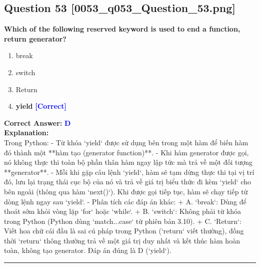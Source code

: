 \documentclass[11pt,a4paper]{article}
\begin{document}
\begin{minipage}{\textwidth}
\subsection*{Question 53 \quad \footnotesize{[0053_q053_Question_53.png]}}
\noindent \textbf{Which of the following reserved keyword is used to end a function, return generator?}

\begin{enumerate}[label=\Alph*.]
    \item break
    \item switch
    \item Return
    \item \textbf{yield} \hfill \textcolor{blue}{\textbf{[Correct]}}
\end{enumerate}

\noindent \textbf{Correct Answer:} \textcolor{blue}{\textbf{D}} \\[4pt]
\noindent \textbf{Explanation:}\\
Trong Python:\newline
- Từ khóa `yield` được sử dụng bên trong một hàm để biến hàm đó thành một **hàm tạo (generator function)**.\newline
- Khi hàm generator được gọi, nó không thực thi toàn bộ phần thân hàm ngay lập tức mà trả về một đối tượng **generator**.\newline
- Mỗi khi gặp câu lệnh `yield`, hàm sẽ tạm dừng thực thi tại vị trí đó, lưu lại trạng thái cục bộ của nó và trả về giá trị biểu thức đi kèm `yield` cho bên ngoài (thông qua hàm `next()`). Khi được gọi tiếp tục, hàm sẽ chạy tiếp từ dòng lệnh ngay sau `yield`.\newline
- Phân tích các đáp án khác:\newline
  + A. `break`: Dùng để thoát sớm khỏi vòng lặp `for` hoặc `while`.\newline
  + B. `switch`: Không phải từ khóa trong Python (Python dùng `match...case` từ phiên bản 3.10).\newline
  + C. `Return`: Viết hoa chữ cái đầu là sai cú pháp trong Python (`return` viết thường), đồng thời `return` thông thường trả về một giá trị duy nhất và kết thúc hàm hoàn toàn, không tạo generator.\newline
Đáp án đúng là D (`yield`).
\end{minipage}
\vspace{0.8cm}
\hrule
\vspace{0.5cm}
\end{document}
